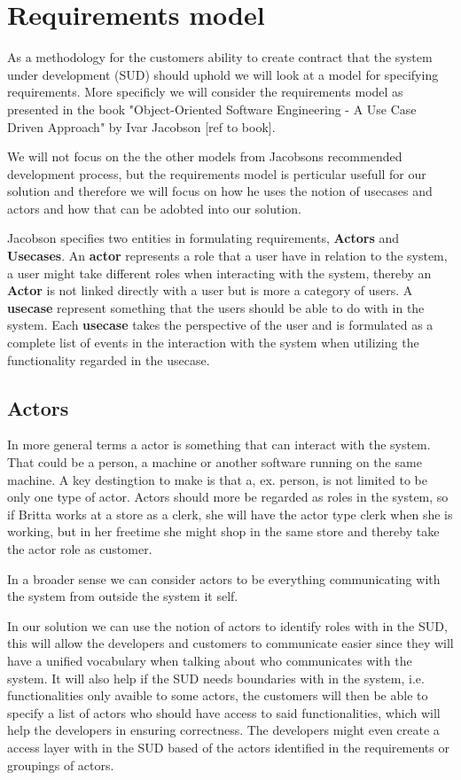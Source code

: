 \section{Requirements model}

As a methodology for the customers ability to create contract that the system under development (SUD) should uphold we will look at a model for specifying requirements.
More specificly we will consider the requirements model as presented in the book "Object-Oriented Software Engineering - A Use Case Driven Approach" by Ivar Jacobson [ref to book].

We will not focus on the the other models from Jacobsons recommended development process, but the requirements model is perticular usefull for our solution and therefore we will focus on how he uses the notion of usecases and actors and how that can be adobted into our solution.

Jacobson specifies two entities in formulating requirements, \textbf{Actors} and \textbf{Usecases}.
An \textbf{actor} represents a role that a user have in relation to the system, a user might take different roles when interacting with the system, thereby an \textbf{Actor} is not linked directly with a user but is more a category of users.
A \textbf{usecase} represent something that the users should be able to do with in the system. Each \textbf{usecase} takes the perspective of the user and is formulated as a complete list of events in the interaction with the system when utilizing the functionality regarded in the usecase.

\subsection{Actors}
In more general terms a actor is something that can interact with the system. That could be a person, a machine or another software running on the same machine. 
A key destingtion to make is that a, ex. person, is not limited to be only one type of actor.
Actors should more be regarded as roles in the system, so if Britta works at a store as a clerk, she will have the actor type clerk when she is working, but in her freetime she might shop in the same store and thereby take the actor role as customer. 

In a broader sense we can consider actors to be everything communicating with the system from outside the system it self.

In our solution we can use the notion of actors to identify roles with in the SUD, this will allow the developers and customers to communicate easier since they will have a unified vocabulary when talking about who communicates with the system. 
It will also help if the SUD needs boundaries with in the system, i.e. functionalities only avaible to some actors, the customers will then be able to specify a list of actors who should have access to said functionalities, which will help the developers in ensuring correctness.
The developers might even create a access layer with in the SUD based of the actors identified in the requirements or groupings of actors.

